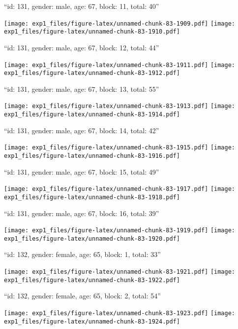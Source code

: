 \documentclass[11pt,,]{article}
\begin{document}
\newpage
[1] 

``id: 131, gender: male, age: 67, block: 11, total: 40''

\texttt{[image: exp1\_files/figure-latex/unnamed-chunk-83-1909.pdf]}
\texttt{[image: exp1\_files/figure-latex/unnamed-chunk-83-1910.pdf]}

\newpage
[1] 

``id: 131, gender: male, age: 67, block: 12, total: 44''

\texttt{[image: exp1\_files/figure-latex/unnamed-chunk-83-1911.pdf]}
\texttt{[image: exp1\_files/figure-latex/unnamed-chunk-83-1912.pdf]}

\newpage
[1] 

``id: 131, gender: male, age: 67, block: 13, total: 55''

\texttt{[image: exp1\_files/figure-latex/unnamed-chunk-83-1913.pdf]}
\texttt{[image: exp1\_files/figure-latex/unnamed-chunk-83-1914.pdf]}

\newpage
[1] 

``id: 131, gender: male, age: 67, block: 14, total: 42''

\texttt{[image: exp1\_files/figure-latex/unnamed-chunk-83-1915.pdf]}
\texttt{[image: exp1\_files/figure-latex/unnamed-chunk-83-1916.pdf]}

\newpage
[1] 

``id: 131, gender: male, age: 67, block: 15, total: 49''

\texttt{[image: exp1\_files/figure-latex/unnamed-chunk-83-1917.pdf]}
\texttt{[image: exp1\_files/figure-latex/unnamed-chunk-83-1918.pdf]}

\newpage
[1] 

``id: 131, gender: male, age: 67, block: 16, total: 39''

\texttt{[image: exp1\_files/figure-latex/unnamed-chunk-83-1919.pdf]}
\texttt{[image: exp1\_files/figure-latex/unnamed-chunk-83-1920.pdf]}

\newpage
[1] 

``id: 132, gender: female, age: 65, block: 1, total: 33''

\texttt{[image: exp1\_files/figure-latex/unnamed-chunk-83-1921.pdf]}
\texttt{[image: exp1\_files/figure-latex/unnamed-chunk-83-1922.pdf]}

\newpage
[1] 

``id: 132, gender: female, age: 65, block: 2, total: 54''

\texttt{[image: exp1\_files/figure-latex/unnamed-chunk-83-1923.pdf]}
\texttt{[image: exp1\_files/figure-latex/unnamed-chunk-83-1924.pdf]}
\end{document}
